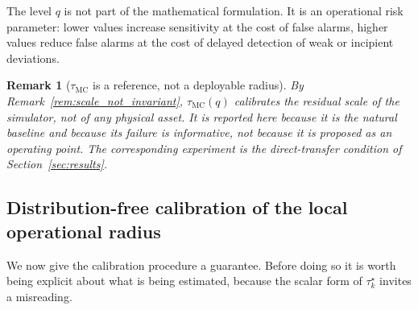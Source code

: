 \documentclass[a4paper]{cas-sc}
\newtheorem{remark}{Remark}
\newcommand{\taumc}{\ensuremath{\tau_{\mathrm{MC}}}}
\begin{document}
The level \(q\) is not part of the mathematical formulation. It is an
operational risk parameter: lower values increase sensitivity at the cost of
false alarms, higher values reduce false alarms at the cost of delayed
detection of weak or incipient deviations.

\begin{remark}[\(\taumc\) is a reference, not a deployable radius]
\label{rem:mc_not_deployable}
By Remark~\ref{rem:scale_not_invariant}, \(\taumc(q)\) calibrates the
residual scale of the \emph{simulator}, not of any physical asset. It is
reported here because it is the natural baseline and because its failure is
informative, not because it is proposed as an operating point. The
corresponding experiment is the direct-transfer condition of
Section~\ref{sec:results}.
\end{remark}

\subsection{Distribution-free calibration of the local operational radius}
\label{subsec:distribution_free}

We now give the calibration procedure a guarantee. Before doing so it is
worth being explicit about what is being estimated, because the scalar form
of \(\tau_k^\star\) invites a misreading.
\end{document}
